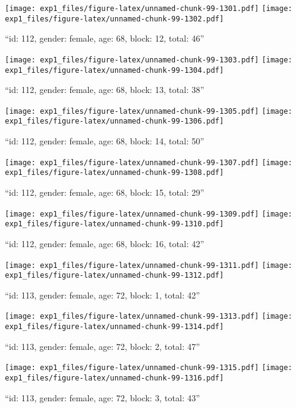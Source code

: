 \documentclass[,]{article}
\begin{document}
\texttt{[image: exp1\_files/figure-latex/unnamed-chunk-99-1301.pdf]}
\texttt{[image: exp1\_files/figure-latex/unnamed-chunk-99-1302.pdf]}

\newpage
[1] 

``id: 112, gender: female, age: 68, block: 12, total: 46''

\texttt{[image: exp1\_files/figure-latex/unnamed-chunk-99-1303.pdf]}
\texttt{[image: exp1\_files/figure-latex/unnamed-chunk-99-1304.pdf]}

\newpage
[1] 

``id: 112, gender: female, age: 68, block: 13, total: 38''

\texttt{[image: exp1\_files/figure-latex/unnamed-chunk-99-1305.pdf]}
\texttt{[image: exp1\_files/figure-latex/unnamed-chunk-99-1306.pdf]}

\newpage
[1] 

``id: 112, gender: female, age: 68, block: 14, total: 50''

\texttt{[image: exp1\_files/figure-latex/unnamed-chunk-99-1307.pdf]}
\texttt{[image: exp1\_files/figure-latex/unnamed-chunk-99-1308.pdf]}

\newpage
[1] 

``id: 112, gender: female, age: 68, block: 15, total: 29''

\texttt{[image: exp1\_files/figure-latex/unnamed-chunk-99-1309.pdf]}
\texttt{[image: exp1\_files/figure-latex/unnamed-chunk-99-1310.pdf]}

\newpage
[1] 

``id: 112, gender: female, age: 68, block: 16, total: 42''

\texttt{[image: exp1\_files/figure-latex/unnamed-chunk-99-1311.pdf]}
\texttt{[image: exp1\_files/figure-latex/unnamed-chunk-99-1312.pdf]}

\newpage
[1] 

``id: 113, gender: female, age: 72, block: 1, total: 42''

\texttt{[image: exp1\_files/figure-latex/unnamed-chunk-99-1313.pdf]}
\texttt{[image: exp1\_files/figure-latex/unnamed-chunk-99-1314.pdf]}

\newpage
[1] 

``id: 113, gender: female, age: 72, block: 2, total: 47''

\texttt{[image: exp1\_files/figure-latex/unnamed-chunk-99-1315.pdf]}
\texttt{[image: exp1\_files/figure-latex/unnamed-chunk-99-1316.pdf]}

\newpage
[1] 

``id: 113, gender: female, age: 72, block: 3, total: 43''
\end{document}
